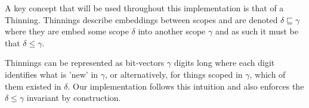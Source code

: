 
A key concept that will be used throughout this implementation is that
of a Thinning. Thinnings describe embeddings between scopes and are
denoted $δ ⊑ γ$ where they are embed some scope $δ$ into another
scope $γ$ and as such it must be that $δ \leq γ$.

Thinnings can be represented as bit-vectors $γ$ digits long where each
digit identifies what is 'new' in $γ$, or alternatively, for things scoped
in $γ$, which of them existed in $δ$. Our implementation follows this
intuition and also enforces the $δ \leq γ$ invariant by construction.

